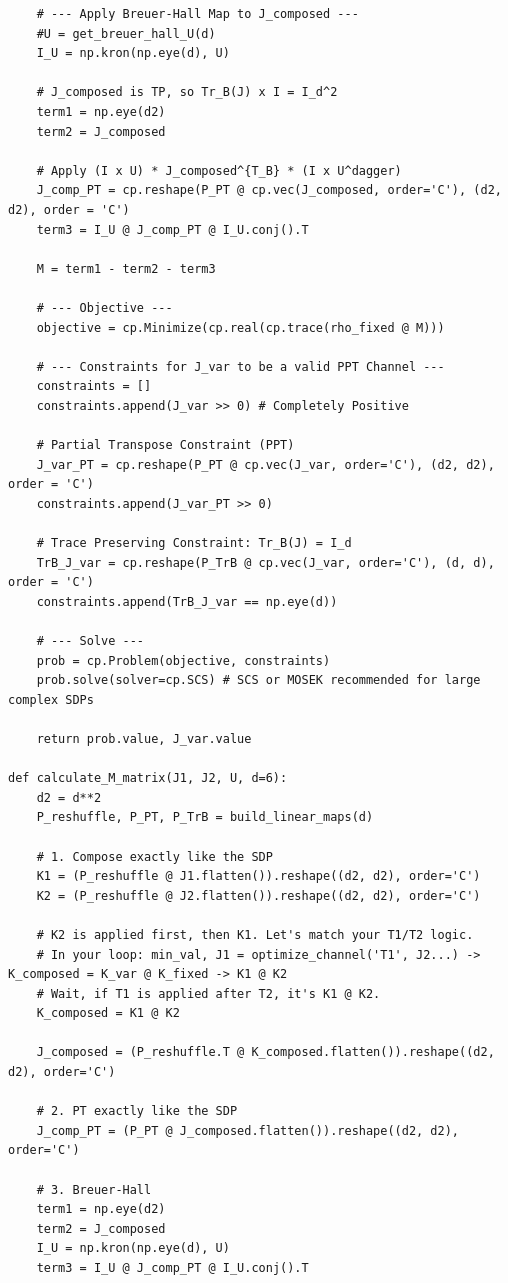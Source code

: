 \begin{lstlisting}
    # --- Apply Breuer-Hall Map to J_composed ---
    #U = get_breuer_hall_U(d)
    I_U = np.kron(np.eye(d), U)
    
    # J_composed is TP, so Tr_B(J) x I = I_d^2
    term1 = np.eye(d2)
    term2 = J_composed
    
    # Apply (I x U) * J_composed^{T_B} * (I x U^dagger)
    J_comp_PT = cp.reshape(P_PT @ cp.vec(J_composed, order='C'), (d2, d2), order = 'C')
    term3 = I_U @ J_comp_PT @ I_U.conj().T
    
    M = term1 - term2 - term3
    
    # --- Objective ---
    objective = cp.Minimize(cp.real(cp.trace(rho_fixed @ M)))
    
    # --- Constraints for J_var to be a valid PPT Channel ---
    constraints = []
    constraints.append(J_var >> 0) # Completely Positive
    
    # Partial Transpose Constraint (PPT)
    J_var_PT = cp.reshape(P_PT @ cp.vec(J_var, order='C'), (d2, d2), order = 'C')
    constraints.append(J_var_PT >> 0)
    
    # Trace Preserving Constraint: Tr_B(J) = I_d
    TrB_J_var = cp.reshape(P_TrB @ cp.vec(J_var, order='C'), (d, d), order = 'C')
    constraints.append(TrB_J_var == np.eye(d))
    
    # --- Solve ---
    prob = cp.Problem(objective, constraints)
    prob.solve(solver=cp.SCS) # SCS or MOSEK recommended for large complex SDPs
    
    return prob.value, J_var.value

def calculate_M_matrix(J1, J2, U, d=6):
    d2 = d**2
    P_reshuffle, P_PT, P_TrB = build_linear_maps(d)
    
    # 1. Compose exactly like the SDP
    K1 = (P_reshuffle @ J1.flatten()).reshape((d2, d2), order='C')
    K2 = (P_reshuffle @ J2.flatten()).reshape((d2, d2), order='C')
    
    # K2 is applied first, then K1. Let's match your T1/T2 logic.
    # In your loop: min_val, J1 = optimize_channel('T1', J2...) -> K_composed = K_var @ K_fixed -> K1 @ K2
    # Wait, if T1 is applied after T2, it's K1 @ K2.
    K_composed = K1 @ K2 
    
    J_composed = (P_reshuffle.T @ K_composed.flatten()).reshape((d2, d2), order='C')
    
    # 2. PT exactly like the SDP
    J_comp_PT = (P_PT @ J_composed.flatten()).reshape((d2, d2), order='C')
    
    # 3. Breuer-Hall
    term1 = np.eye(d2)
    term2 = J_composed
    I_U = np.kron(np.eye(d), U)
    term3 = I_U @ J_comp_PT @ I_U.conj().T
    

\end{lstlisting}
